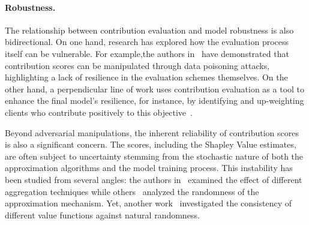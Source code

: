 \documentclass{uai2026}
\begin{document}


\paragraph{Robustness. }

The relationship between contribution evaluation and model robustness is also bidirectional. On one hand, research has explored how the evaluation process itself can be vulnerable. For example,the authors in~\cite{xu2024ace,pejo2025fragility} have demonstrated that contribution scores can be manipulated through data poisoning attacks, highlighting a lack of resilience in the evaluation schemes themselves. On the other hand, a perpendicular line of work uses contribution evaluation as a tool to enhance the final model's resilience, for instance, by identifying and up-weighting clients who contribute positively to this objective~\cite{guan2022few,otmani2024fedsv}.

Beyond adversarial manipulations, the inherent reliability of contribution scores is also a significant concern. The scores, including the Shapley Value estimates, are often subject to uncertainty stemming from the stochastic nature of both the approximation algorithms and the model training process. This instability has been studied from several angles: the authors in~\cite{pejo2025fragility} examined the effect of different aggregation techniques while others~\cite{goldwasser2024stabilizing} analyzed the randomness of the approximation mechanism. Yet, another work~\cite{wang2023data} investigated the consistency of different value functions against natural randomness.
\end{document}
